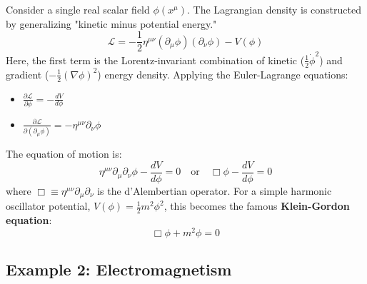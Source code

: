 \documentclass[11pt, a4paper]{report}
\begin{document}
Consider a single real scalar field $\phi(x^\mu)$. The Lagrangian density is constructed by generalizing "kinetic minus potential energy."
\begin{equation}
    \mathcal{L} = -\frac{1}{2}\eta^{\mu\nu}(\partial_\mu\phi)(\partial_\nu\phi) - V(\phi)
\end{equation}
Here, the first term is the Lorentz-invariant combination of kinetic ($\frac{1}{2}\dot{\phi}^2$) and gradient ($-\frac{1}{2}(\nabla\phi)^2$) energy density. Applying the Euler-Lagrange equations:
\begin{itemize}
    \item $\frac{\partial\mathcal{L}}{\partial\phi} = -\frac{dV}{d\phi}$
    \item $\frac{\partial\mathcal{L}}{\partial(\partial_\mu\phi)} = -\eta^{\mu\nu}\partial_\nu\phi$
\end{itemize}
The equation of motion is:
\begin{equation}
    \eta^{\mu\nu}\partial_\mu\partial_\nu\phi - \frac{dV}{d\phi} = 0 \quad \text{or} \quad \Box\phi - \frac{dV}{d\phi} = 0
\end{equation}
where $\Box \equiv \eta^{\mu\nu}\partial_\mu\partial_\nu$ is the d'Alembertian operator. For a simple harmonic oscillator potential, $V(\phi) = \frac{1}{2}m^2\phi^2$, this becomes the famous \textbf{Klein-Gordon equation}:
\begin{equation}
    \Box\phi + m^2\phi = 0
\end{equation}

\subsection*{Example 2: Electromagnetism}
\end{document}
